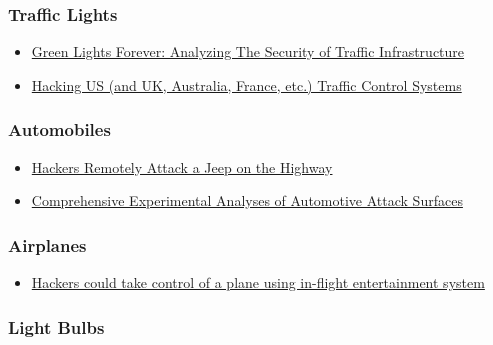\hypertarget{traffic-lights}{%
\subsubsection{Traffic Lights}\label{traffic-lights}}

\begin{itemize}
\tightlist
\item
  \href{https://jhalderm.com/pub/papers/traffic-woot14.pdf}{Green Lights
  Forever: Analyzing The Security of Traffic Infrastructure}
\item
  \href{http://blog.ioactive.com/2014/04/hacking-us-and-uk-australia-france-etc.html}{Hacking
  US (and UK, Australia, France, etc.) Traffic Control Systems}
\end{itemize}

\hypertarget{automobiles}{%
\subsubsection{Automobiles}\label{automobiles}}

\begin{itemize}
\tightlist
\item
  \href{http://www.wired.com/2015/07/hackers-remotely-kill-jeep-highway/}{Hackers
  Remotely Attack a Jeep on the Highway}
\item
  \href{http://static.usenix.org/events/sec11/tech/full_papers/Checkoway.pdf}{Comprehensive
  Experimental Analyses of Automotive Attack Surfaces}
\end{itemize}

\hypertarget{airplanes}{%
\subsubsection{Airplanes}\label{airplanes}}

\begin{itemize}
\tightlist
\item
  \href{http://www.telegraph.co.uk/technology/2016/12/20/hackers-could-take-control-plane-using-in-flight-entertainment/}{Hackers
  could take control of a plane using in-flight entertainment system}
\end{itemize}

\hypertarget{light-bulbs}{%
\subsubsection{Light Bulbs}\label{light-bulbs}}

